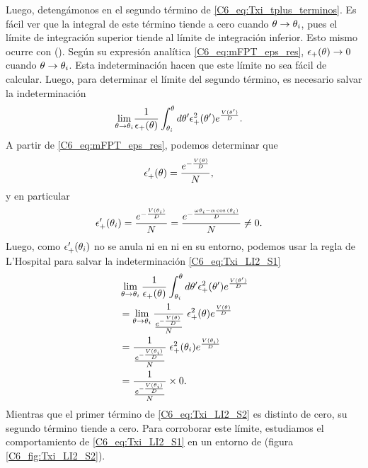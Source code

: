 \documentclass[./main.tex]{subfiles}
\begin{document}
Luego, detengámonos en el segundo término de \ref{C6_eq:Txi_tplus_terminos}. Es fácil ver que la integral de este término tiende a cero cuando $\theta \rightarrow \theta_i $, pues el límite de integración superior tiende al límite de integración inferior. Esto mismo ocurre con \epsplus(\xx). Según su expresión analítica \ref{C6_eq:mFPT_eps_res}, $\epsilon_{+}(\theta) \rightarrow 0$ cuando $\theta \rightarrow \theta_i $. Esta indeterminación hacen que este límite no sea fácil de calcular. Luego, para determinar el límite del segundo término, es necesario salvar la indeterminación 
\begin{align}
      \lim_{\theta \rightarrow   \theta_i }& \frac{1}{\epsilon_{+}(\theta)}  \int_{\theta_i}^{\theta} d\theta'  \epsilon_{+}^2(\theta') e^{ \frac{V(\theta')}{D}}.
     \label{C6_eq:Txi_LI2_S1}
\end{align}
A partir de \ref{C6_eq:mFPT_eps_res}, podemos determinar que 
\begin{align}
     \epsilon_{+}'(\theta) & = \frac{e^{- \frac{V(\theta)}{D}}}{N},
\end{align}
y en particular 
\begin{align}
     \epsilon_{+}'(\theta_i) & = \frac{e^{- \frac{V(\theta_i)}{D}}}{N} = \frac{e^{- \frac{\omega \theta_i - \alpha \cos{(\ensuremath{\theta_i})}}{D}}}{N} \neq 0.
\end{align}
Luego, como $\epsilon_{+}'(\theta_i)$ no se anula ni en \xxi ni en su entorno, podemos usar la regla de L'Hospital para salvar la indeterminación \ref{C6_eq:Txi_LI2_S1}
\begin{align}
     & \lim_{\theta \rightarrow   \theta_i } \frac{1}{\epsilon_{+}(\theta)}  \int_{\theta_i}^{\theta} d\theta'  \epsilon_{+}^2(\theta') e^{ \frac{V(\theta')}{D}}\\
     & = \lim_{\theta \rightarrow   \theta_i } \frac{1}{\frac{e^{- \frac{V(\theta)}{D}}}{N}}  \; \epsilon_{+}^2(\theta) e^{ \frac{V(\theta)}{D}} \\
     & = \frac{1}{\frac{e^{- \frac{V(\theta_i)}{D}}}{N}}  \; \epsilon_{+}^2(\theta_i) e^{ \frac{V(\theta_i)}{D}} \\
     & = \frac{1}{\frac{e^{- \frac{V(\theta_i)}{D}}}{N}}  \times 0. 
     \label{C6_eq:Txi_LI2_S2}
\end{align}
Mientras que el primer término de \ref{C6_eq:Txi_LI2_S2} es distinto de cero, su segundo término tiende a cero. Para corroborar este límite, estudiamos el comportamiento de \ref{C6_eq:Txi_LI2_S1} en un entorno de \xxi (figura \ref{C6_fig:Txi_LI2_S2}).
\end{document}
